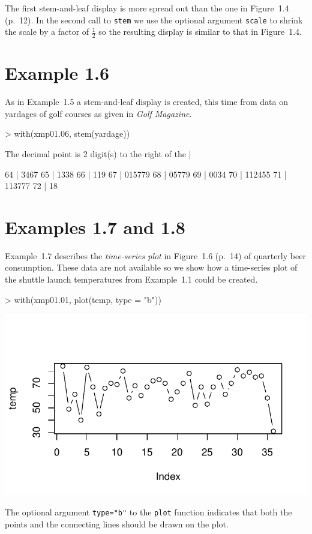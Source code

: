 \documentclass{book}
\begin{document}
The first stem-and-leaf display is more spread out than the one in
Figure~1.4 (p.~12).  In the second call to \texttt{stem} we use the
optional argument \texttt{scale} to shrink the scale by a factor of
$\frac{1}{2}$ so the resulting display is similar to that in
Figure~1.4.


\section{Example 1.6}
\label{sec:xmp01.06}

As in Example~1.5 a stem-and-leaf display is created, this time from
data on yardages of golf courses as given in \emph{Golf Magazine}.
\begin{Schunk}
\begin{Sinput}
> with(xmp01.06, stem(yardage))
\end{Sinput}
\begin{Soutput}
  The decimal point is 2 digit(s) to the right of the |

  64 | 3467
  65 | 1338
  66 | 119
  67 | 015779
  68 | 05779
  69 | 0034
  70 | 112455
  71 | 113777
  72 | 18
\end{Soutput}
\end{Schunk}


\section{Examples 1.7 and 1.8}
\label{sec:xmp01.07}

Example~1.7 describes the \emph{time-series plot} in Figure~1.6
(p.~14) of quarterly beer consumption.  These data are not available
so we show how a time-series plot of the shuttle launch temperatures
from Example~1.1 could be created.



\begin{center}
\begin{Schunk}
\begin{Sinput}
> with(xmp01.01, plot(temp, type = "b"))
\end{Sinput}
\end{Schunk}
\includegraphics{Devore6-xmp0107}
\end{center}%
The optional argument \texttt{type="b"} to the \texttt{plot} function
indicates that both the points and the connecting lines should be drawn on
the plot.
\end{document}
